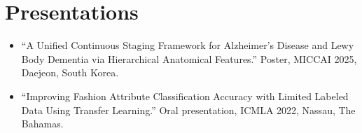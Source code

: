 \section{Presentations}
\begin{itemize}
  \item ``A Unified Continuous Staging Framework for Alzheimer's Disease and Lewy Body
        Dementia via Hierarchical Anatomical Features.'' Poster, MICCAI 2025, Daejeon,
        South Korea.
  \item ``Improving Fashion Attribute Classification Accuracy with Limited Labeled Data
        Using Transfer Learning.'' Oral presentation, ICMLA 2022, Nassau, The Bahamas.
\end{itemize}
